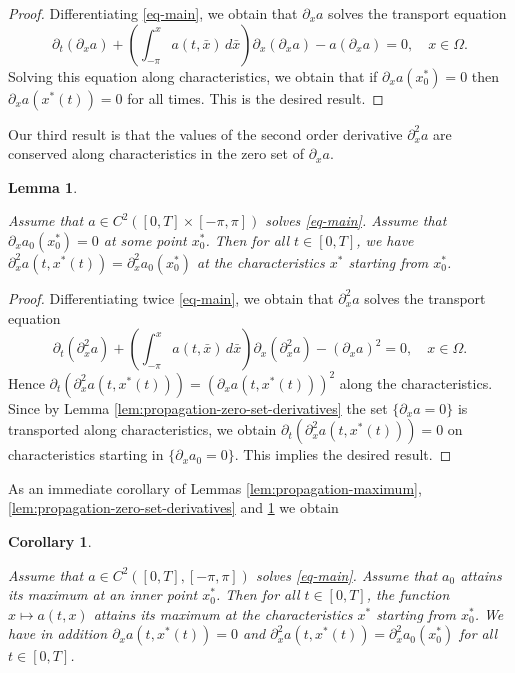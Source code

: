 \documentclass[12pt]{amsart}
\numberwithin{equation}{section}
\numberwithin{equation}{section}
\newtheorem{lem}[thm]{Lemma}
\newtheorem{cor}[thm]{Corollary}
\begin{document}
\begin{proof}

Differentiating \eqref{eq-main}, we obtain that $\partial_x a$ solves the transport equation
$$
\partial_t (\partial_x a)+  \left(\int_{-\pi}^x a(t, \bar x) \,d\bar x\right) \partial_x (\partial_x a) - a (\partial_x a ) =0, \quad x\in\Omega.
$$
Solving this equation along characteristics, we obtain that if $\partial_x a(x^*_0)=0$ then $\partial_x a(x^*(t))=0$ for all times. This is the desired result.
\end{proof}


Our third result is that the values of the second order derivative $\partial_x^2 a$ are conserved along characteristics in the zero set of $\partial_x a$.


\begin{lem} \label{lem:conservation-second-derivative-zero-set-derivatives}

Assume that $a\in C^2([0,T]\times[-\pi,\pi])$ solves \eqref{eq-main}. Assume that $\partial_x a_0(x^*_0)=0$ at some point $x_0^*$. Then for all $t\in [0,T]$, we have $\partial_x^2 a(t,x^*(t))=\partial_x^2 a_0(x^*_0)$ at the characteristics $x^*$ starting from $x^*_0$.

\end{lem}


\begin{proof}

Differentiating twice \eqref{eq-main}, we obtain that $\partial_x^2 a$ solves the transport equation
$$
\partial_t (\partial_x^2 a)+  \left(\int_{-\pi}^x a(t, \bar x) \,d\bar x\right) \partial_x (\partial_x^2 a) - (\partial_x a)^2 =0, \quad x\in\Omega.
$$
Hence $\partial_t(\partial_x^2 a(t,x^*(t)))= (\partial_x a(t, x^*(t)))^2$ along the characteristics. Since by Lemma \ref{lem:propagation-zero-set-derivatives} the set $\{\partial_x a=0\}$ is transported along characteristics, we obtain $\partial_t(\partial_x^2 a(t,x^*(t)))=0$ on characteristics starting in $\{\partial_x a_0=0\}$. This implies the desired result.
\end{proof}


As an immediate corollary of Lemmas \ref{lem:propagation-maximum}, \ref{lem:propagation-zero-set-derivatives} and \ref{lem:conservation-second-derivative-zero-set-derivatives} we obtain


\begin{cor} \label{cor:propagation-maxima}

Assume that $a\in C^2([0,T],[-\pi,\pi])$ solves \eqref{eq-main}. Assume that $ a_0$ attains its maximum at an inner point $x^*_0$. Then for all $t\in [0,T]$, the function $x\mapsto a(t,x)$ attains its maximum at the characteristics $x^*$ starting from $x^*_0$. We have in addition $\partial_x a(t,x^*(t))=0$ and $\partial_x^2 a(t,x^*(t))=\partial_x^2 a_0(x^*_0)$ for all $t\in [0,T]$.

\end{cor}
\end{document}
